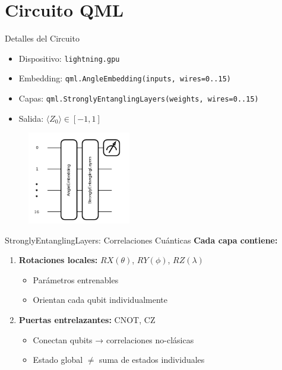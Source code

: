 \documentclass{beamer}
\begin{document}
\section{Circuito QML}
\begin{frame}{Detalles del Circuito}
  \begin{itemize}
    \item Dispositivo: \texttt{lightning.gpu}
    \item Embedding: \texttt{qml.AngleEmbedding(inputs, wires=0..15)}
    \item Capas: \texttt{qml.StronglyEntanglingLayers(weights, wires=0..15)}
    \item Salida: $\langle Z_0\rangle \in [-1,1]$
  \end{itemize}
  \vspace{1em}
  \begin{figure}
    \centering
    \includegraphics[width=0.4\textwidth]{circuito.png}
  \end{figure}
\end{frame}


\begin{frame}{StronglyEntanglingLayers: Correlaciones Cuánticas}
  \textbf{Cada capa contiene:}
  \begin{enumerate}
    \item \textbf{Rotaciones locales:} $RX(\theta)$, $RY(\phi)$, $RZ(\lambda)$ 
    \begin{itemize}
      \item Parámetros entrenables
      \item Orientan cada qubit individualmente
    \end{itemize}
    
    \item \textbf{Puertas entrelazantes:} CNOT, CZ
    \begin{itemize}
      \item Conectan qubits → correlaciones no-clásicas
      \item Estado global $\neq$ suma de estados individuales
    \end{itemize}
  \end{enumerate}

\end{frame}
\end{document}
